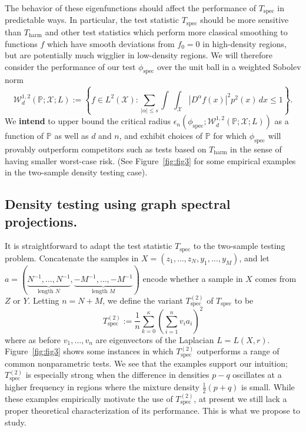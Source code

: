 \documentclass{article}
\newcommand{\abs}[1]{\left \lvert #1 \right \rvert}
\newcommand{\set}[1]{\left\{#1\right\}}
\newcommand{\1}{\mathbf{1}}
\theoremstyle{alden}
\theoremstyle{aldenthm}
\theoremstyle{definition}
\theoremstyle{remark}
\begin{document}
The behavior of these eigenfunctions should affect the performance of $T_{\mathrm{spec}}$ in predictable ways.  In particular, the test statistic $T_{\mathrm{spec}}$ should be more sensitive than $T_{\mathrm{harm}}$ and other test statistics which perform more classical smoothing to functions $f$ which have smooth deviations from $f_0 = 0$ in high-density regions, but are potentially much wigglier in low-density regions. We will therefore consider the performance of our test $\phi_{\mathrm{spec}}$ over the unit ball in a weighted Sobolev norm 
\begin{equation*}
\mathcal{W}_d^{1,2}(\mathbb{P};\mathcal{X};L) := \set{f \in L^2(\mathcal{X}): \sum_{\abs{\alpha} \leq s}\int\ \int_{\mathcal{X}} \abs{D^{\alpha}f(x)}^2 p^2(x)\,dx \leq 1}.
\end{equation*}
We \textbf{intend} to upper bound the critical radius $\epsilon_n(\phi_{\mathrm{spec}};\mathcal{W}_d^{1,2}(\mathbb{P};\mathcal{X};L))$ as a function of $\mathbb{P}$ as well as $d$ and $n$, and exhibit choices of $\mathbb{P}$ for which $\phi_{\mathrm{spec}}$ will provably outperform competitors such as tests based on $T_{\mathrm{harm}}$ in the sense of having smaller worst-case risk. (See Figure~\ref{fig:fig3} for some empirical examples in the two-sample density testing case).

\subsection{Density testing using graph spectral projections.}
\label{subsec:spectral_density_testing}

It is straightforward to adapt the test statistic $T_{\mathrm{spec}}$ to the two-sample testing problem. Concatenate the samples in $X = (z_1,\ldots,z_N,y_1,\ldots,y_M)$, and let $a = (\underbrace{N^{-1},\ldots,{N^{-1}}}_{\textrm{length } N},\underbrace{-M^{-1},\ldots,-M^{-1}}_{\textrm{length } M})$ encode whether a sample in $X$ comes from $Z$ or $Y$. Letting $n = N + M$, we define the variant $T_{\mathrm{spec}}^{(2)}$ of $T_{\mathrm{spec}}$ to be
\begin{equation}
\label{eqn:graph_spectral_projections_2}
T_{\mathrm{spec}}^{(2)} := \frac{1}{n} \sum_{k = 0}^{\kappa} \left(\sum_{i = 1}^{n} v_i a_i\right)^2
\end{equation}
where as before $v_1,\ldots,v_n$ are eigenvectors of the Laplacian $L = L(X,r)$. Figure~\ref{fig:fig3} shows some instances in which $T_{\mathrm{spec}}^{(2)}$ outperforms a range of common nonparametric tests. We see that the examples support our intuition; $T_{\textrm{spec}}^{(2)}$ is especially strong when the difference in densities $p - q$ oscillates at a higher frequency in regions where the mixture density $\frac{1}{2}(p + q)$ is small. While these examples empirically motivate the use of $T_{\mathrm{spec}}^{(2)}$, at present we still lack a proper theoretical characterization of its performance. This is what we propose to study. 
\end{document}
